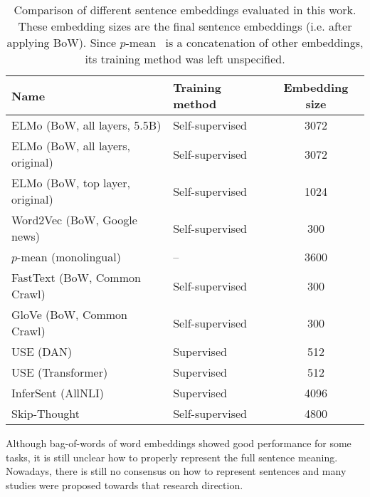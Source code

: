 \documentclass{article}
\begin{document}
\begin{table}
  \caption{Comparison of different sentence embeddings evaluated in this work. These embedding sizes are the final sentence embeddings (i.e. after applying BoW). Since $p$-mean~\cite{DBLP:journals/corr/abs-1803-01400} is a concatenation of other embeddings, its training method was left unspecified.}
  \label{sample-table}
  \centering
  \begin{tabular}{llc}
    \toprule
    Name    & Training method\footnotemark     & Embedding size \\
    \midrule
    ELMo (BoW, all layers, 5.5B) & Self-supervised        & 3072   \\
    ELMo (BoW, all layers, original)  & Self-supervised        & 3072   \\
    ELMo (BoW, top layer, original)  & Self-supervised        & 1024   \\
    Word2Vec (BoW, Google news)       & Self-supervised        & 300  \\
    $p$-mean (monolingual)       & --        & 3600 \\
    FastText (BoW, Common Crawl)          & Self-supervised          & 300   \\
    GloVe (BoW, Common Crawl)            & Self-supervised        & 300  \\
    USE (DAN)            & Supervised          & 512 \\
    USE (Transformer)               & Supervised          & 512 \\
    InferSent (AllNLI)          & Supervised          & 4096 \\
    Skip-Thought           & Self-supervised        & 4800 \\
    \bottomrule
  \end{tabular}

\end{table}

Although bag-of-words of word embeddings showed good performance for some tasks, it is still unclear how to properly represent the full sentence meaning. Nowadays, there is still no consensus on how to represent sentences and many studies were proposed towards that research direction.
\end{document}
